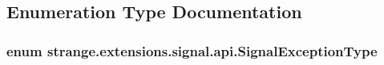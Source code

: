 \subsection{Enumeration Type Documentation}
\hypertarget{namespacestrange_1_1extensions_1_1signal_1_1api_a1303547618565f5ed4dea0f25f27975d}{
\subsubsection[{Signal\-Exception\-Type}]{\setlength{\rightskip}{0pt plus 5cm}enum {\bf strange.\-extensions.\-signal.\-api.\-Signal\-Exception\-Type}}}\label{namespacestrange_1_1extensions_1_1signal_1_1api_a1303547618565f5ed4dea0f25f27975d}
